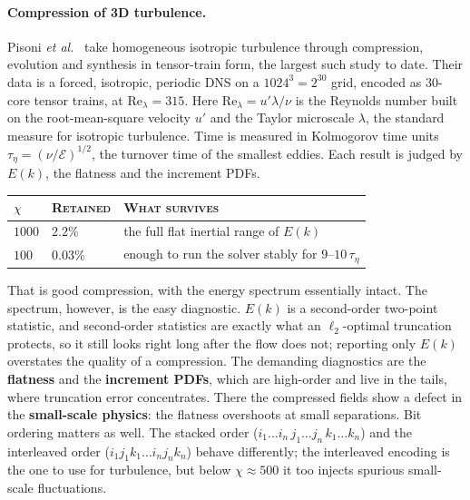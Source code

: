 \paragraph{Compression of 3D turbulence.}
Pisoni \emph{et al.}~\cite{Pisoni2026} take homogeneous isotropic turbulence
through compression, evolution and synthesis in tensor-train form, the largest
such study to date. Their data is a forced, isotropic, periodic DNS on a
$1024^3 = 2^{30}$ grid, encoded as 30-core tensor trains, at
$\mathrm{Re}_\lambda = 315$. Here $\mathrm{Re}_\lambda = u'\lambda/\nu$ is the
Reynolds number built on the root-mean-square velocity $u'$ and the Taylor
microscale $\lambda$, the standard measure for isotropic turbulence. Time is
measured in Kolmogorov time units $\tau_\eta = (\nu/\mathcal{E})^{1/2}$, the
turnover time of the smallest eddies. Each result is judged by $E(k)$, the
flatness and the increment PDFs.

\begin{center}
  \begin{tabular}{@{}llp{}@{}}
    \toprule
    $\chi$ & \textsc{Retained} & \textsc{What survives} \\
    \midrule
    $1000$ & $2.2\%$  & the full flat inertial range of $E(k)$ \\
    $100$  & $0.03\%$ & enough to run the solver stably for $9$--$10\,\tau_\eta$ \\
    \bottomrule
  \end{tabular}
\end{center}

\noindent
That is good compression, with the energy spectrum essentially intact. The
spectrum, however, is the easy diagnostic. $E(k)$ is a second-order two-point
statistic, and second-order statistics are exactly what an $\ell_2$-optimal
truncation protects, so it still looks right long after the flow does not;
reporting only $E(k)$ overstates the quality of a compression. The demanding
diagnostics are the \textbf{flatness} and the \textbf{increment PDFs}, which are
high-order and live in the tails, where truncation error concentrates. There
the compressed fields show a defect in the \textbf{small-scale physics}: the
flatness overshoots at small separations. Bit ordering matters as well. The
stacked order ($i_1\dots i_n\, j_1\dots j_n\, k_1\dots k_n$) and the interleaved
order ($i_1 j_1 k_1 \dots i_n j_n k_n$) behave differently; the interleaved
encoding is the one to use for turbulence, but below $\chi \approx 500$ it too
injects spurious small-scale fluctuations.

